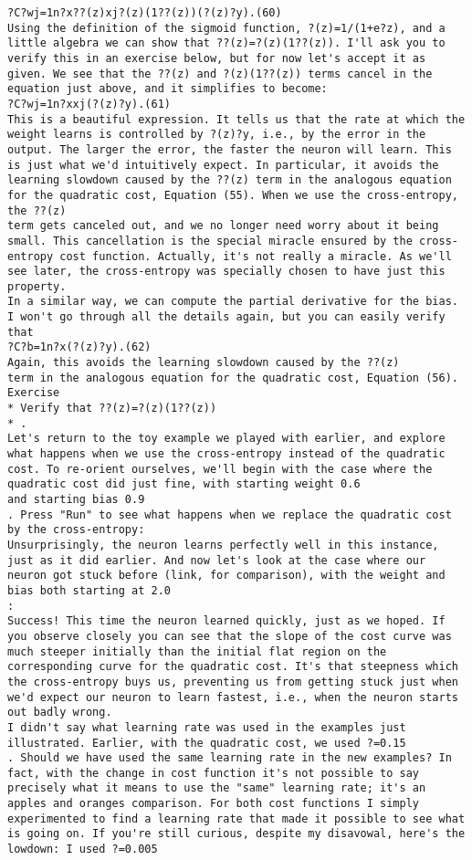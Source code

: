 \begin{lstlisting}
?C?wj=1n?x??(z)xj?(z)(1??(z))(?(z)?y).(60)
Using the definition of the sigmoid function, ?(z)=1/(1+e?z), and a little algebra we can show that ??(z)=?(z)(1??(z)). I'll ask you to verify this in an exercise below, but for now let's accept it as given. We see that the ??(z) and ?(z)(1??(z)) terms cancel in the equation just above, and it simplifies to become: 
?C?wj=1n?xxj(?(z)?y).(61)
This is a beautiful expression. It tells us that the rate at which the weight learns is controlled by ?(z)?y, i.e., by the error in the output. The larger the error, the faster the neuron will learn. This is just what we'd intuitively expect. In particular, it avoids the learning slowdown caused by the ??(z) term in the analogous equation for the quadratic cost, Equation (55). When we use the cross-entropy, the ??(z)
term gets canceled out, and we no longer need worry about it being small. This cancellation is the special miracle ensured by the cross-entropy cost function. Actually, it's not really a miracle. As we'll see later, the cross-entropy was specially chosen to have just this property.
In a similar way, we can compute the partial derivative for the bias. I won't go through all the details again, but you can easily verify that 
?C?b=1n?x(?(z)?y).(62)
Again, this avoids the learning slowdown caused by the ??(z)
term in the analogous equation for the quadratic cost, Equation (56).
Exercise
* Verify that ??(z)=?(z)(1??(z))
* .
Let's return to the toy example we played with earlier, and explore what happens when we use the cross-entropy instead of the quadratic cost. To re-orient ourselves, we'll begin with the case where the quadratic cost did just fine, with starting weight 0.6
and starting bias 0.9
. Press "Run" to see what happens when we replace the quadratic cost by the cross-entropy:
Unsurprisingly, the neuron learns perfectly well in this instance, just as it did earlier. And now let's look at the case where our neuron got stuck before (link, for comparison), with the weight and bias both starting at 2.0
:
Success! This time the neuron learned quickly, just as we hoped. If you observe closely you can see that the slope of the cost curve was much steeper initially than the initial flat region on the corresponding curve for the quadratic cost. It's that steepness which the cross-entropy buys us, preventing us from getting stuck just when we'd expect our neuron to learn fastest, i.e., when the neuron starts out badly wrong.
I didn't say what learning rate was used in the examples just illustrated. Earlier, with the quadratic cost, we used ?=0.15
. Should we have used the same learning rate in the new examples? In fact, with the change in cost function it's not possible to say precisely what it means to use the "same" learning rate; it's an apples and oranges comparison. For both cost functions I simply experimented to find a learning rate that made it possible to see what is going on. If you're still curious, despite my disavowal, here's the lowdown: I used ?=0.005

\end{lstlisting}
